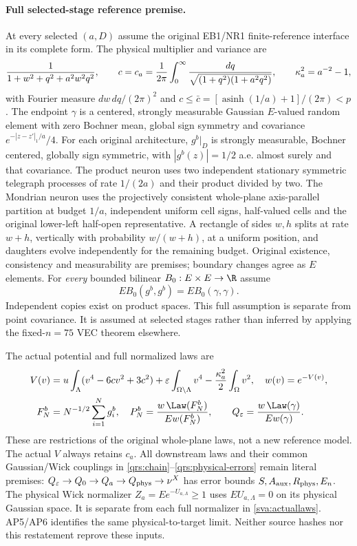 \paragraph{Full selected-stage reference premise.}
At every selected $(a,D)$ assume the original EB1/NR1 finite-reference
interface in its complete form. The physical multiplier and variance are
\begin{equation}\label{sva:physicalvariance}
 {1\over1+w^2+q^2+a^2w^2q^2},\qquad
 c=c_a={1\over2\pi}\int_0^\infty
 {dq\over\sqrt{(1+q^2)(1+a^2q^2)}},\qquad \kappa_a^2=a^{-2}-1,
\end{equation}
with Fourier measure $dw\,dq/(2\pi)^2$ and
$c\le\bar c=[\operatorname{asinh}(1/a)+1]/(2\pi)<p$.
The endpoint $\gamma$ is a centered, strongly measurable Gaussian
$E$-valued random element with zero Bochner mean, global sign symmetry
and covariance $e^{-|z-z'|_1/a}/4$. For each original architecture,
$g^b|_D$ is strongly measurable, Bochner centered, globally sign
symmetric, with $|g^b(z)|=1/2$ a.e. almost surely and that covariance.
The product neuron uses two independent stationary symmetric telegraph
processes of rate $1/(2a)$ and their product divided by two. The Mondrian
neuron uses the projectively consistent whole-plane axis-parallel
partition at budget $1/a$, independent uniform cell signs, half-valued
cells and the original lower-left half-open representative. A rectangle
of sides $w,h$ splits at rate $w+h$, vertically with probability
$w/(w+h)$, at a uniform position, and daughters evolve independently for
the remaining budget. Original existence, consistency and measurability
are premises; boundary changes agree as $E$ elements. For \emph{every}
bounded bilinear $B_0:E\times E\to\R$ assume
\begin{equation}\label{sva:bilinear}
 E B_0(g^b,g^b)=E B_0(\gamma,\gamma).
\end{equation}
Independent copies exist on product spaces. This full assumption is
separate from point covariance. It is assumed at selected stages rather
than inferred by applying the fixed-$n=75$ VEC theorem elsewhere.

The actual potential and full normalized laws are
\begin{align}\label{sva:actuallaws}
 V(v)&=u\int_\Lambda(v^4-6cv^2+3c^2)
       +\varepsilon\int_{\Omega\setminus\Lambda}v^4
       -{\kappa_a^2\over2}\int_\Omega v^2,\quad w(v)=e^{-V(v)},\nonumber\\
 F_N^b&=N^{-1/2}\sum_{i=1}^N g_i^b,\quad
 P_N^b={w\,\Law(F_N^b)\over Ew(F_N^b)},\qquad
 Q_\varepsilon={w\,\Law(\gamma)\over Ew(\gamma)}.
\end{align}
These are restrictions of the original whole-plane laws, not a new
reference model. The actual $V$ always retains $c_a$. All downstream
laws and their common Gaussian/Wick couplings in
\eqref{qrs:chain}--\eqref{qrs:physical-errors} remain literal premises:
$Q_\varepsilon\to Q_0\to Q_a\to Q_{\rm phys}\to\nu^X$ has error bounds
$S,A_{\rm aux},R_{\rm phys},E_n$. The physical Wick normalizer
$Z_a=E e^{-U_{a,\Lambda}}\ge1$ uses $EU_{a,\Lambda}=0$ on its physical
Gaussian space. It is separate from each full normalizer in
\eqref{sva:actuallaws}. AP5/AP6 identifies the same physical-to-target
limit. Neither source hashes nor this restatement reprove these inputs.


